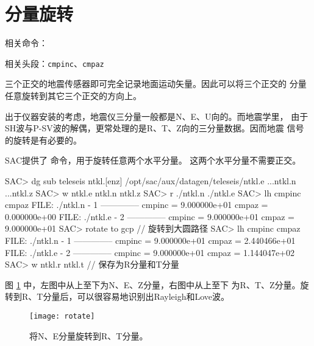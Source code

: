 \section{分量旋转}
\label{sec:traces-rotating}
相关命令：

相关头段：\texttt{cmpinc}、\texttt{cmpaz}

三个正交的地震传感器即可完全记录地面运动矢量。因此可以将三个正交的
分量任意旋转到其它三个正交的方向上。

出于仪器安装的考虑，地震仪三分量一般都是N、E、U向的。而地震学里，
由于SH波与P-SV波的解偶，更常处理的是R、T、Z向的三分量数据。因而地震
信号的旋转是有必要的。

SAC提供了  命令，用于旋转任意两个水平分量。
这两个水平分量不需要正交。

\begin{SACCode}
SAC> dg sub teleseis ntkl.[enz]
/opt/sac/aux/datagen/teleseis/ntkl.e ...ntkl.n ...ntkl.z
SAC> w ntkl.e ntkl.n ntkl.z
SAC> r ./ntkl.n ./ntkl.e
SAC> lh cmpinc cmpaz
  FILE: ./ntkl.n - 1
 --------------
     cmpinc = 9.000000e+01
      cmpaz = 0.000000e+00
  FILE: ./ntkl.e - 2
 --------------
     cmpinc = 9.000000e+01
      cmpaz = 9.000000e+01
SAC> rotate to gcp              // 旋转到大圆路径
SAC> lh cmpinc cmpaz
  FILE: ./ntkl.n - 1
 --------------
     cmpinc = 9.000000e+01
      cmpaz = 2.440466e+01
  FILE: ./ntkl.e - 2
 --------------
     cmpinc = 9.000000e+01
      cmpaz = 1.144047e+02
SAC> w ntkl.r ntkl.t            // 保存为R分量和T分量
\end{SACCode}

图 \ref{fig:rotate} 中，左图中从上至下为N、E、Z分量，右图中从上至下
为R、T、Z分量。旋转到R、T分量后，可以很容易地识别出Rayleigh和Love波。

\begin{figure}[H]
\centering
\texttt{[image: rotate]}
\caption[水平分量旋转]{将N、E分量旋转到R、T分量。}
\label{fig:rotate}
\end{figure}
